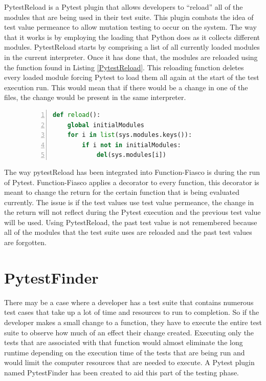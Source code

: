 PytestReload is a Pytest plugin that allows developers to ``reload'' all of the modules that are being used in their test suite. This plugin combats the idea of test value permeance to allow mutation testing to occur on the system. The way that it works is by employing the loading that Python does as it collects different modules. PytestReload starts by comprising a list of all currently loaded modules in the current interpreter. Once it has done that, the modules are reloaded using the function found in Listing \ref{PytestReload}. This reloading function deletes every loaded module forcing Pytest to load them all again at the start of the test execution run. This would mean that if there would be a change in one of the files, the change would be present in the same interpreter.

\begin{figure}[t!]
\begin{lstlisting}[language = Python, numbers = left, frame = single, caption = PytestReload reloading function., label = PytestReload]
def reload():
    global initialModules
    for i in list(sys.modules.keys()):
        if i not in initialModules:
            del(sys.modules[i])
\end{lstlisting}
\end{figure}

The way pytestReload has been integrated into Function-Fiasco is during the run of Pytest. Function-Fiasco applies a decorator to every function, this decorator is meant to change the return for the certain function that is being evaluated currently. The issue is if the test values use test value permeance, the change in the return will not reflect during the Pytest execution and the previous test value will be used. Using PytestReload, the past test value is not remembered because all of the modules that the test suite uses are reloaded and the past test values are forgotten.


\section{PytestFinder}
There may be a case where a developer has a test suite that contains numerous test cases that take up a lot of time and resources to run to completion. So if the developer makes a small change to a function, they have to execute the entire test suite to observe how much of an effect their change created. Executing only the tests that are associated with that function would almost eliminate the long runtime depending on the execution time of the tests that are being run and would limit the computer resources that are needed to execute. A Pytest plugin named PytestFinder has been created to aid this part of the testing phase.

